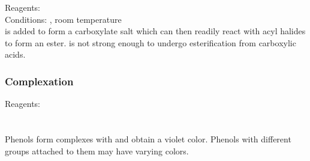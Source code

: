 \documentclass[../main]{subfiles}
\begin{document}
	Reagents:  \\
	Conditions: , room temperature \\

	 is added to form a carboxylate salt which can then readily react with acyl halides to form an ester.  is not strong enough to undergo esterification from carboxylic acids. \\

	\subsubsection{Complexation}

	Reagents:  \\

	 \\
	 \\

	Phenols form complexes with  and obtain a violet color. Phenols with different groups attached to them may have varying colors.

	
\end{document}
